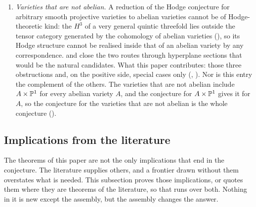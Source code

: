 \begin{enumerate}[label=\textup{(C\arabic*)},leftmargin=3.0em,itemsep=4pt]
  (). So the Hodge conjecture for abelian varieties
  does not reduce to Weil classes, and the statement needed is the
  algebraicity of these classes themselves. What this paper contributes: the
  example, made exact, and the forms of their algebraicity studied in
  .
\item \emph{Varieties that are not abelian.} A reduction of the Hodge
  conjecture for arbitrary smooth projective varieties to abelian varieties
  cannot be of Hodge-theoretic kind: the $H^{3}$ of a very
  general quintic threefold lies outside the tensor category generated by the
  cohomology of abelian varieties (), so its Hodge
  structure cannot be realised inside that of an abelian variety by any
  correspondence.  and  close the
  two routes through hyperplane sections that would be the natural candidates.
  What this paper contributes: those three obstructions and, on the positive
  side, special cases only (,
  ). Nor is this entry the complement of the others. The varieties
  that are not abelian include $A\times\mathbb{P}^{1}$ for every abelian variety
  $A$, and the
  conjecture for $A\times\mathbb{P}^{1}$ gives it for $A$, so the conjecture for
  the varieties that are not abelian is the whole conjecture
  ().
\end{enumerate}

\subsection{Implications from the literature}\label{ssec:bullseye}

The theorems of this paper are not the only implications that end in the
conjecture. The literature supplies others, and a frontier drawn without
them overstates what is needed. This subsection proves those implications, or
quotes them where they are theorems of the literature, so that
 runs over both. Nothing in it is new
except the assembly, but the assembly changes the answer.

